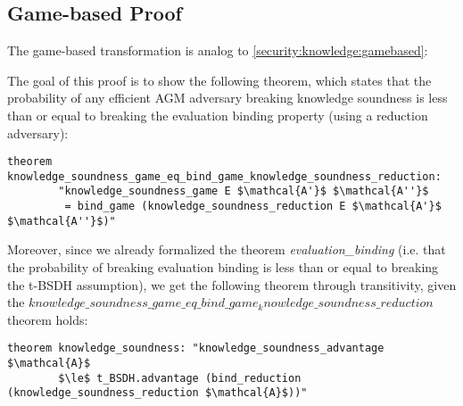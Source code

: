 \subsection*{Game-based Proof}
\label{batch:security:knowledge:gamebased}

The game-based transformation is analog to \ref{security:knowledge:gamebased}:

The goal of this proof is to show the following theorem, which states that the probability of any efficient AGM adversary breaking  knowledge soundness is less than or equal to breaking the evaluation binding property (using a reduction adversary):

\begin{lstlisting}[language=isabelle]
    theorem knowledge_soundness_game_eq_bind_game_knowledge_soundness_reduction: 
        "knowledge_soundness_game E $\mathcal{A'}$ $\mathcal{A''}$ 
         = bind_game (knowledge_soundness_reduction E $\mathcal{A'}$ $\mathcal{A''}$)"
\end{lstlisting}
Moreover, since we already formalized the theorem \textit{evaluation\_binding} (i.e. that the probability of breaking evaluation binding is less than or equal to breaking the t-BSDH assumption), we get the following theorem through transitivity, given the $knowledge\_soundness\_game\_eq\_bind\_game_knowledge\_soundness\_reduction$ theorem holds: 

\begin{lstlisting}[language=isabelle]
    theorem knowledge_soundness: "knowledge_soundness_advantage $\mathcal{A}$ 
        $\le$ t_BSDH.advantage (bind_reduction (knowledge_soundness_reduction $\mathcal{A}$))"
\end{lstlisting}

